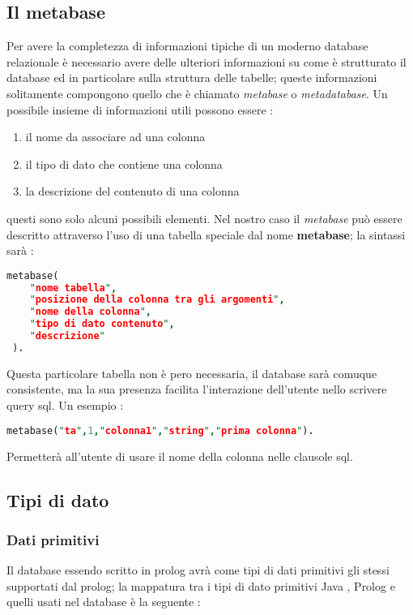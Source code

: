 \subsection{Il metabase}
Per avere la completezza di informazioni tipiche di un moderno database relazionale è necessario avere delle ulteriori informazioni su come è strutturato il database ed in particolare sulla struttura delle tabelle; queste informazioni solitamente compongono quello che è chiamato \emph{metabase} o \emph{metadatabase}. Un possibile insieme di informazioni utili possono essere : 
\begin{enumerate}
\item il nome da associare ad una colonna
\item il tipo di dato che contiene una colonna
\item la descrizione del contenuto di una colonna 
\end{enumerate}
questi sono solo alcuni possibili elementi. Nel nostro caso il \emph{metabase} può essere descritto attraverso l'uso di una tabella speciale dal nome {\bf metabase}; la sintassi sarà : 
\begin{lstlisting}[language=Prolog,showstringspaces=false]
 metabase(
	"nome tabella",
	"posizione della colonna tra gli argomenti",
	"nome della colonna",
	"tipo di dato contenuto",
	"descrizione"
 ).
\end{lstlisting}
Questa particolare tabella non è pero necessaria, il database sarà comuque consistente, ma la sua presenza facilita l'interazione dell'utente nello scrivere query sql. Un esempio :
\begin{lstlisting}[language=Prolog,showstringspaces=false]
 metabase("ta",1,"colonna1","string","prima colonna").
\end{lstlisting}
Permetterà all'utente di usare il nome della colonna nelle clausole sql.

\subsection{Tipi di dato}

\subsubsection{Dati primitivi}

Il database essendo scritto in prolog avrà come tipi di dati primitivi gli stessi supportati dal prolog;  la mappatura tra i tipi di dato primitivi Java , Prolog e quelli usati nel database è la seguente :

